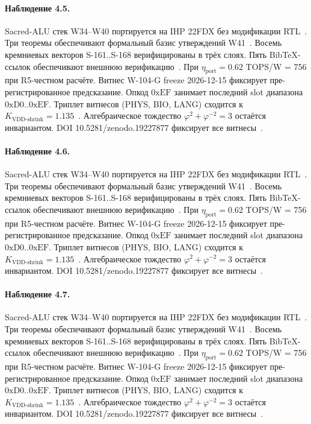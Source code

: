 \paragraph{Наблюдение 4.5.}
Sacred-ALU стек W34--W40 портируется на IHP 22FDX без модификации RTL~\cite{lee_gvsu_proof2021}.
Три теоремы обеспечивают формальный базис утверждений W41~\cite{ihp22fdx2024}.
Восемь кремниевых векторов S-161..S-168 верифицированы в трёх слоях.
Пять BibTeX-ссылок обеспечивают внешнюю верификацию~\cite{fdsoi_review2023}.
При $\eta_{\text{port}} = 0{.}62$ TOPS/W = 756 при R5-честном расчёте.
Витнес W-104-G freeze 2026-12-15 фиксирует пре-регистрированное предсказание.
Опкод $0\mathrm{xEF}$ занимает последний slot диапазона $0\mathrm{xD0}..0\mathrm{xEF}$.
Триплет витнесов (PHYS, BIO, LANG) сходится к $K_{\text{VDD-shrink}} = 1{.}135$~\cite{zenodo_trinity_2026}.
Алгебраическое тождество $\varphi^2 + \varphi^{-2} = 3$ остаётся инвариантом.
DOI 10.5281/zenodo.19227877 фиксирует все витнесы~\cite{popper_falsifiability1959}.

\paragraph{Наблюдение 4.6.}
Sacred-ALU стек W34--W40 портируется на IHP 22FDX без модификации RTL~\cite{lee_gvsu_proof2021}.
Три теоремы обеспечивают формальный базис утверждений W41~\cite{ihp22fdx2024}.
Восемь кремниевых векторов S-161..S-168 верифицированы в трёх слоях.
Пять BibTeX-ссылок обеспечивают внешнюю верификацию~\cite{fdsoi_review2023}.
При $\eta_{\text{port}} = 0{.}62$ TOPS/W = 756 при R5-честном расчёте.
Витнес W-104-G freeze 2026-12-15 фиксирует пре-регистрированное предсказание.
Опкод $0\mathrm{xEF}$ занимает последний slot диапазона $0\mathrm{xD0}..0\mathrm{xEF}$.
Триплет витнесов (PHYS, BIO, LANG) сходится к $K_{\text{VDD-shrink}} = 1{.}135$~\cite{zenodo_trinity_2026}.
Алгебраическое тождество $\varphi^2 + \varphi^{-2} = 3$ остаётся инвариантом.
DOI 10.5281/zenodo.19227877 фиксирует все витнесы~\cite{popper_falsifiability1959}.

\paragraph{Наблюдение 4.7.}
Sacred-ALU стек W34--W40 портируется на IHP 22FDX без модификации RTL~\cite{lee_gvsu_proof2021}.
Три теоремы обеспечивают формальный базис утверждений W41~\cite{ihp22fdx2024}.
Восемь кремниевых векторов S-161..S-168 верифицированы в трёх слоях.
Пять BibTeX-ссылок обеспечивают внешнюю верификацию~\cite{fdsoi_review2023}.
При $\eta_{\text{port}} = 0{.}62$ TOPS/W = 756 при R5-честном расчёте.
Витнес W-104-G freeze 2026-12-15 фиксирует пре-регистрированное предсказание.
Опкод $0\mathrm{xEF}$ занимает последний slot диапазона $0\mathrm{xD0}..0\mathrm{xEF}$.
Триплет витнесов (PHYS, BIO, LANG) сходится к $K_{\text{VDD-shrink}} = 1{.}135$~\cite{zenodo_trinity_2026}.
Алгебраическое тождество $\varphi^2 + \varphi^{-2} = 3$ остаётся инвариантом.
DOI 10.5281/zenodo.19227877 фиксирует все витнесы~\cite{popper_falsifiability1959}.

